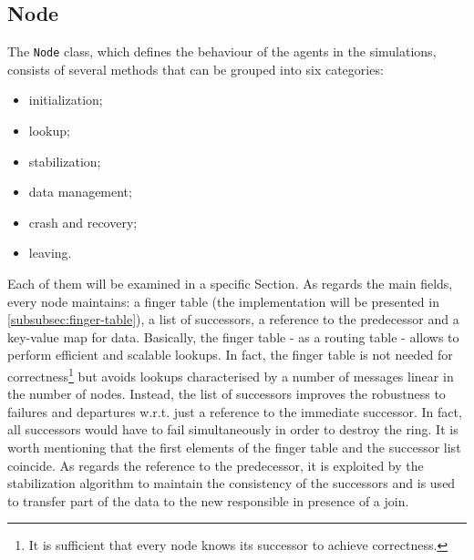 \documentclass[11pt,twocolumn,letterpaper]{article}
\begin{document}
	
	\subsection{Node}
	\label{subsec:node}
	The \texttt{Node} class, which defines the behaviour of the agents in the simulations, consists of several methods that can be grouped into six categories:
	\vspace{-2pt}
	\begin{itemize}
		\itemsep0pt
		\item initialization;
		\item lookup;
		\item stabilization;
		\item data management;
		\item crash and recovery;
		\item leaving.
	\end{itemize}
	\vspace{-1pt}
	Each of them will be examined in a specific Section. As regards the main fields, every node maintains: a finger table (the implementation will be presented in \cref{subsubsec:finger-table}), a list of successors, a reference to the predecessor and a key-value map for data. \newline
	Basically, the finger table - as a routing table - allows to perform efficient and scalable lookups. In fact, the finger table is not needed for correctness\footnote{It is sufficient that every node knows its successor to achieve correctness.} but avoids lookups characterised by a number of messages linear in the number of nodes. \newline
	Instead, the list of successors improves the robustness to failures and departures w.r.t. just a reference to the immediate successor. In fact, all successors would have to fail simultaneously in order to destroy the ring. It is worth mentioning that the first elements of the finger table and the successor list coincide. \newline
	As regards the reference to the predecessor, it is exploited by the stabilization algorithm to maintain the consistency of the successors and is used to transfer part of the data to the new responsible in presence of a join.
	
\end{document}
